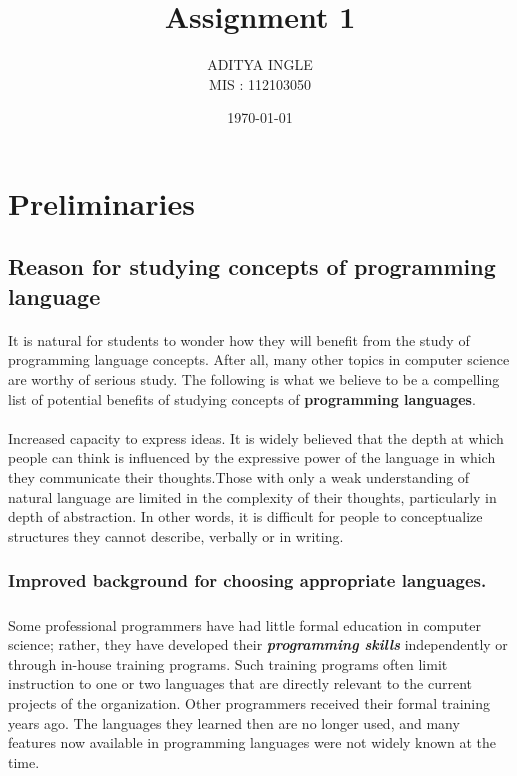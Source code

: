 \documentclass[12pt]{article}
\author{\large ADITYA INGLE\\MIS : 112103050}
\date{\today}
\begin{document}
\title{\huge \bf Assignment 1}
\maketitle
\tableofcontents
\raggedright
{}
\newpage
{}
\section{\textbf{Preliminaries}}
\vspace{5mm}
\subsection{\large Reason for studying concepts of programming language}
\paragraph{} It is natural for students to wonder how they will benefit from the study of programming language concepts. After all, many other topics in computer science 
are worthy of serious study. The following is what we believe to be a compelling 
list of potential benefits of studying concepts of \textbf {programming languages}.
\paragraph{} Increased capacity to express ideas. It is widely believed that the depth at which 
people can think is influenced by the expressive power of the language in 
which they communicate their thoughts.Those with only a weak understanding of natural language are limited in the complexity of their thoughts, 
particularly in depth of abstraction. In other words, it is difficult for people 
to conceptualize structures they cannot describe, verbally or in writing.
\subsubsection{Improved background for choosing appropriate languages.}
\subparagraph{} Some professional 
programmers have had little formal education in computer science; rather, 
they have developed their \textbf {\textit {programming skills}} independently or through 
in-house training programs. Such training programs often limit instruction 
to one or two languages that are directly relevant to the current projects 
of the organization. Other programmers received their formal training 
years ago. The languages they learned then are no longer used, and many 
features now available in programming languages were not widely known 
at the time.
\end{document}
